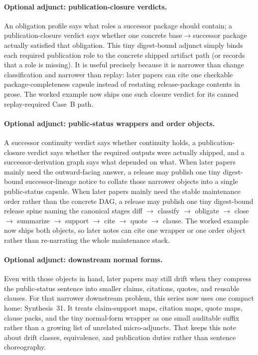 \documentclass[11pt]{article}
\begin{document}
\paragraph{Optional adjunct: publication-closure verdicts.}
An obligation profile says what roles a successor package should contain; a publication-closure verdict says whether one concrete base$\to$successor package actually satisfied that obligation. This tiny digest-bound adjunct simply binds each required publication role to the concrete shipped artifact path (or records that a role is missing). It is useful precisely because it is narrower than change classification and narrower than replay: later papers can cite one checkable package-completeness capsule instead of restating release-package contents in prose. The worked example now ships one such closure verdict for its canned replay-required Case~B path.\cite{series:workedexample,series:auditorreplay}

\paragraph{Optional adjunct: public-status wrappers and order objects.}
A successor continuity verdict says whether continuity holds, a publication-closure verdict says whether the required outputs were actually shipped, and a successor-derivation graph says what depended on what.
When later papers mainly need the outward-facing answer, a release may publish one tiny digest-bound successor-lineage notice to collate those narrower objects into a single public-status capsule.
When later papers mainly need the stable maintenance order rather than the concrete DAG, a release may publish one tiny digest-bound release spine naming the canonical stages diff $\to$ classify $\to$ obligate $\to$ close $\to$ summarize $\to$ support $\to$ cite $\to$ quote $\to$ clause.
The worked example now ships both objects, so later notes can cite one wrapper or one order object rather than re-narrating the whole maintenance stack.\cite{series:workedexample,series:auditorreplay}

\paragraph{Optional adjunct: downstream normal forms.}
Even with those objects in hand, later papers may still drift when they compress the public-status sentence into smaller claims, citations, quotes, and reusable clauses.
For that narrower downstream problem, this series now uses one compact home: Synthesis~31.
It treats claim-support maps, citation maps, quote maps, clause packs, and the tiny normal-form wrapper as one small auditable suffix rather than a growing list of unrelated micro-adjuncts.
That keeps this note about drift classes, equivalence, and publication duties rather than sentence choreography.\cite{series:downstreamnormalforms,series:workedexample}
\end{document}
